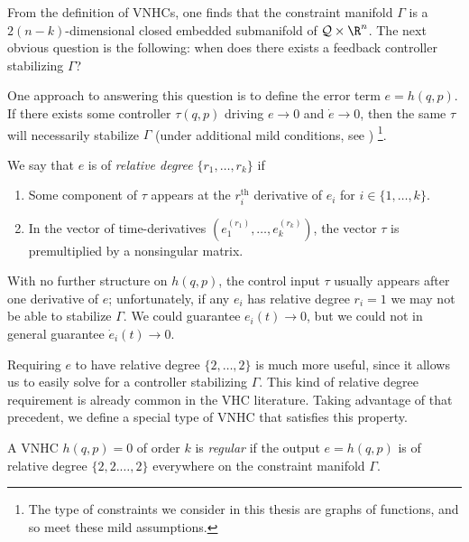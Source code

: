 From the definition of VNHCs, one finds that the constraint manifold \(\Gamma\)
is a \(2(n-k)\)-dimensional closed embedded submanifold of \(\mathcal{Q} \times \R^n\). 
The next obvious question is the following: when does there exists a feedback
controller stabilizing \(\Gamma\)? 

One approach to answering this question is to
define the error term \(e = h(q,p)\). 
If there exists some controller \(\tau(q,p)\) driving \(e \to 0\) and 
\(\dot{e} \to 0\), then the same \(\tau\) will necessarily stabilize \(\Gamma\)
(under additional mild conditions, see \cite{vhcs_for_el_systems})
\footnote{The type of constraints we consider in this thesis are graphs of
functions, and so meet these mild assumptions.}.

We say that \(e\) is of \textit{relative degree} \(\{r_1,\ldots,r_k\}\) if
\begin{enumerate}
    \item Some component of \(\tau\) appears at the \(r_i^\text{th}\) derivative
        of \(e_i\) for \(i \in \{1,\ldots,k\}\).
    \item In the vector of time-derivatives
        \((e_1^{(r_1)}, \ldots, e_k^{(r_k)})\), the vector \(\tau\) is
        premultiplied by a nonsingular matrix.
\end{enumerate}
With no further structure on \(h(q,p)\), the control input \(\tau\) usually
appears after one derivative of \(e\); 
unfortunately, if any \(e_i\) has relative degree \(r_i = 1\) we may not
be able to stabilize \(\Gamma\). 
We could guarantee \(e_i(t) \to 0\), but we could not in general guarantee 
\(\dot{e}_i(t) \to 0\). 

Requiring \(e\) to have relative degree \(\{2,\ldots,2\}\) is much more
useful, since it allows us to easily solve for a controller stabilizing \(\Gamma\).
This kind of relative degree requirement is already common in the VHC
literature.
Taking advantage of that precedent, we define a special type of VNHC that
satisfies this property.

\begin{defn}
    A VNHC \(h(q,p) = 0\) of order \(k\) is \textit{regular} if the output 
    \(e = h(q,p)\) is of relative degree \(\{2,2.\ldots,2\}\) everywhere on the
    constraint manifold \(\Gamma\).
\end{defn}

